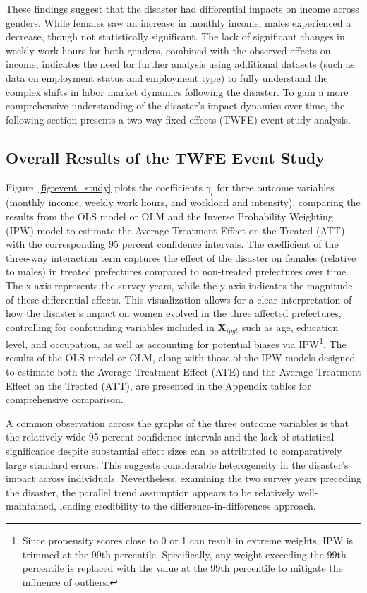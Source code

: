 \documentclass[a4paper,12pt]{article}
\begin{document}
These findings suggest that the disaster had differential impacts on income across genders. While females saw an increase in monthly income, males experienced a decrease, though not statistically significant. The lack of significant changes in weekly work hours for both genders, combined with the observed effects on income, indicates the need for further analysis using additional datasets (such as data on employment status and employment type) to fully understand the complex shifts in labor market dynamics following the disaster. To gain a more comprehensive understanding of the disaster's impact dynamics over time, the following section presents a two-way fixed effects (TWFE) event study analysis.


\subsection{Overall Results of the TWFE Event Study}

Figure~\ref{fig:event_study} plots the coefficients $\gamma_l$ for three outcome variables (monthly income, weekly work hours, and workload and intensity), comparing the results from the OLS model or OLM and the Inverse Probability Weighting (IPW) model to estimate the Average Treatment Effect on the Treated (ATT) with the corresponding 95 percent confidence intervals. The coefficient of the three-way interaction term captures the effect of the disaster on females (relative to males) in treated prefectures compared to non-treated prefectures over time. The x-axis represents the survey years, while the y-axis indicates the magnitude of these differential effects. This visualization allows for a clear interpretation of how the disaster's impact on women evolved in the three affected prefectures, controlling for confounding variables included in $\mathbf{X}_{ipgt}$ such as age, education level, and occupation, as well as accounting for potential biases via IPW\footnote{Since propensity scores close to 0 or 1 can result in extreme weights, IPW is trimmed at the 99th percentile. Specifically, any weight exceeding the 99th percentile is replaced with the value at the 99th percentile to mitigate the influence of outliers.}. The results of the OLS model or OLM, along with those of the IPW models designed to estimate both the Average Treatment Effect (ATE) and the Average Treatment Effect on the Treated (ATT), are presented in the Appendix tables for comprehensive comparison.

A common observation across the graphs of the three outcome variables is that the relatively wide 95 percent confidence intervals and the lack of statistical significance despite substantial effect sizes can be attributed to comparatively large standard errors. This suggests considerable heterogeneity in the disaster's impact across individuals. Nevertheless, examining the two survey years preceding the disaster, the parallel trend assumption appears to be relatively well-maintained, lending credibility to the difference-in-differences approach. 
\end{document}
